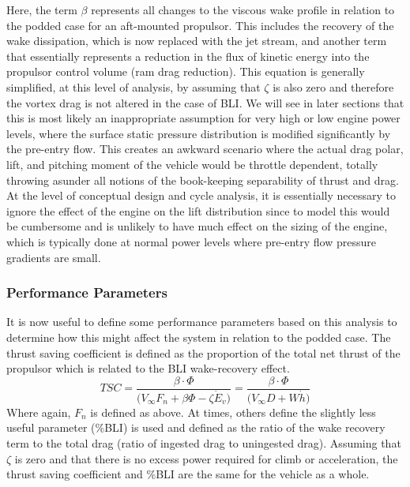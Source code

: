 					Here, the term $\beta$ represents all changes to the viscous wake profile in relation to the podded case for an aft-mounted propulsor.  This includes the recovery of the wake dissipation, which is now replaced with the jet stream, and another term that essentially represents a reduction in the flux of kinetic energy into the propulsor control volume (ram drag reduction).  This equation is generally simplified, at this level of analysis, by assuming that $\zeta$ is also zero and therefore the vortex drag is not altered in the case of BLI.  We will see in later sections that this is most likely an inappropriate assumption for very high or low engine power levels, where the surface static pressure distribution is modified significantly by the pre-entry flow.  This creates an awkward scenario where the actual drag polar, lift, and pitching moment of the vehicle would be throttle dependent, totally throwing asunder all notions of the book-keeping separability of thrust and drag.  At the level of conceptual design and cycle analysis, it is essentially necessary to ignore the effect of the engine on the lift distribution since to model this would be cumbersome and is unlikely to have much effect on the sizing of the engine, which is typically done at normal power levels where pre-entry flow pressure gradients are small.  																	 
					
				\subsubsection{Performance Parameters}
					It is now useful to define some performance parameters based on this analysis to determine how this might affect the system in relation to the podded case. The thrust saving coefficient is defined as the proportion of the total net thrust of the propulsor which is related to the BLI wake-recovery effect.  
					\begin{equation}
						TSC = \frac{\beta \cdot \Phi}{\Big(V_\infty F_n  + \beta \Phi - \zeta \dot{E}_v \Big)} = 
						\frac{\beta \cdot \Phi}{\Big(V_\infty D + W\dot{h} \Big)} 
						\label{Thrust_Saving_Coefficient}
					\end{equation}
					Where again, $F_n$ is defined as above.  At times, others define the slightly less useful parameter (\%BLI) is used and defined as the ratio of the wake recovery term to the total drag (ratio of ingested drag to uningested drag).  Assuming that $\zeta$ is zero and that there is no excess power required for climb or acceleration, the thrust saving coefficient and \%BLI are the same for the vehicle as a whole.  																									


